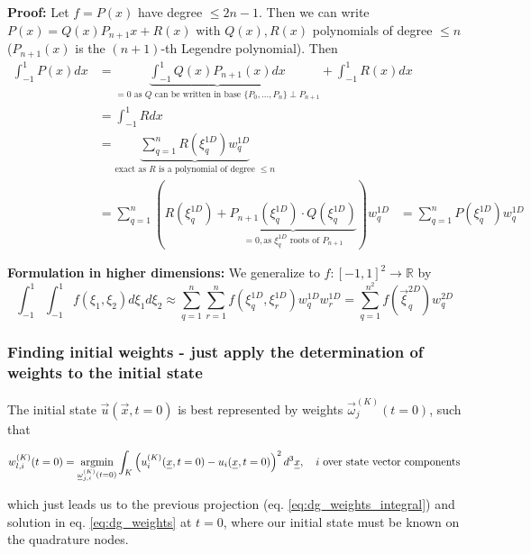 \textbf{Proof: } Let $f = P(x)$ have degree $\leq 2n-1$. Then we can write
$P(x) = Q(x) P_{n+1}{x} + R(x)$ with $Q(x), R(x)$ polynomials of degree $\leq n$ ($P_{n+1}(x)$ is the $(n+1)$-th Legendre polynomial).
Then 
\begin{equation}
    \begin{aligned}
        \int_{-1}^{1} P(x) d x &=\underbrace{\int_{-1}^{1} Q(x) P_{n+1}(x) d x}_{=0\text{ as } Q \text{ can be written in base } \{P_0,\dots,P_n\} \perp P_{n+1}}+\int_{-1}^{1} R(x) d x \\
        &=\int_{-1}^{1} R d x \\
        &=\underbrace{\sum_{q=1}^{n} R\left(\xi_{q}^{1 D}\right) w_{q}^{1 D}}_{\text{exact as } R \text{ is a polynomial of degree } \leq n} \\
        &=\sum_{q=1}^{n} \left( R\left(\xi_{q}^{1 D}\right) + \underbrace{P_{n+1}(\xi_{q}^{1 D}) \cdot Q(\xi_{q}^{1 D})}_{=0, \text{as } \xi_{q}^{1 D} \text{ roots of } P_{n+1}} \right)w_{q}^{1 D}
        &= \sum_{q=1}^{n} P(\xi_{q}^{1 D}) w_{q}^{1 D}
    \end{aligned}
\end{equation}

\textbf{Formulation in higher dimensions: } We generalize to $f: [-1,1]^2 \rightarrow \mathbb{R}$ by
\begin{equation}
    \int_{-1}^1 \int_{-1}^1 f\left(\xi_1, \xi_2\right) d \xi_1 d \xi_2 \approx \sum_{q=1}^n \sum_{r=1}^n f\left(\xi_q^{1 D}, \xi_r^{1 D}\right) w_q^{1 D} w_r^{1 D}=\sum_{q=1}^{n^2} f\left(\vec{\xi}_q^{2 D}\right) w_q^{2 D}
\end{equation}

\subsubsection{Finding initial weights - just apply the determination of weights to the initial state}
The initial state $\vec{u}(\vec{x}, t=0)$ is best represented by weights $\vec{\omega}_j^{(K)}(t=0)$, such that

\begin{equation}
    w_{l,i}^{(K)}(t=0)= \argmin_{\vec{\omega}_{j,i}^{(K)}(t=0)} \int_{K} \left( u_i^{(K)}(\vec{x}, t=0) - u_i(\vec{x}, t=0) \right)^2 d^3 \vec{x}, \quad i \text{ over state vector components}
\end{equation}

which just leads us to the previous projection (eq. \ref{eq:dg_weights_integral}) and solution in eq. \ref{eq:dg_weights} at $t=0$, where
our initial state must be known on the quadrature nodes.

